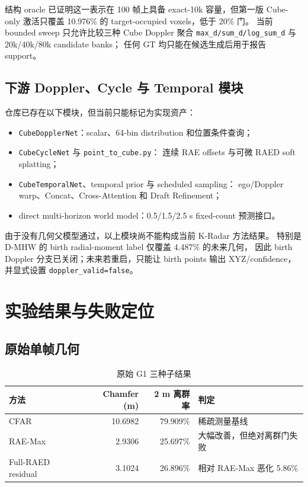 \documentclass[11pt,a4paper,fontset=none]{ctexart}
\newcommand{\code}[1]{\texttt{#1}}
\begin{document}
结构 oracle 已证明这一表示在 100 帧上具备 exact-10k 容量，但第一版
Cube-only 激活只覆盖 10.976\% 的 target-occupied voxels，低于 20\% 门。
当前 bounded sweep 只允许比较三种 Cube Doppler 聚合
\code{max\_d/sum\_d/log\_sum\_d} 与 20k/40k/80k candidate banks；
任何 GT 均只能在候选生成后用于报告 support。

\subsection{下游 Doppler、Cycle 与 Temporal 模块}

仓库已存在以下模块，但当前只能标记为实现资产：
\begin{itemize}
  \item \code{CubeDopplerNet}：scalar、64-bin distribution 和位置条件查询；
  \item \code{CubeCycleNet} 与 \code{point\_to\_cube.py}：
  连续 RAE offsets 与可微 RAED soft splatting；
  \item \code{CubeTemporalNet}、temporal prior 与 scheduled sampling：
  ego/Doppler warp、Concat、Cross-Attention 和 Draft Refinement；
  \item direct multi-horizon world model：0.5/1.5/2.5 s fixed-count 预测接口。
\end{itemize}

由于没有几何父模型通过，以上模块尚不能构成当前 K-Radar 方法结果。
特别是 D-MHW 的 birth radial-moment label 仅覆盖 4.487\% 的未来几何，
因此 birth Doppler 分支已关闭；未来若重启，只能让 birth points
输出 XYZ/confidence，并显式设置 \code{doppler\_valid=false}。

\section{实验结果与失败定位}

\subsection{原始单帧几何}

\begin{table}[H]
\centering
\caption{原始 G1 三种子结果}
\begin{tabular}{lrrl}
\toprule
方法 & Chamfer (m) & 2 m 离群率 & 判定 \\
\midrule
CFAR & 10.6982 & 79.909\% & 稀疏测量基线 \\
RAE-Max & 2.9306 & 25.697\% & 大幅改善，但绝对离群门失败 \\
Full-RAED residual & 3.1024 & 26.896\% & 相对 RAE-Max 恶化 5.86\% \\
\bottomrule
\end{tabular}
\end{table}
\end{document}
